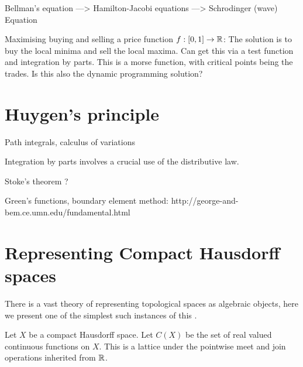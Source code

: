 \documentclass[11pt]{article}
\begin{document}
Bellman's equation ---> Hamilton-Jacobi equations ---> Schrodinger (wave) Equation


Maximising buying and selling a price function $f:[0,1]\to \mathbb R$:
    The solution is to buy the local minima and sell the
    local maxima. Can get this via a test function and
    integration by parts. This is a morse function, with
    critical points being the trades.
    Is this also the dynamic programming solution?

%
%

\section{Huygen's principle}

Path integrals, calculus of variations

Integration by parts involves a crucial use of the distributive law.

Stoke's theorem ? %

Green's functions,
boundary element method: http://george-and-bem.ce.umn.edu/fundamental.html


\section{Representing Compact Hausdorff spaces}


There is a vast theory of representing topological spaces as
algebraic objects, here we present one of the simplest such
instances of this
\cite{Nagata1985}.


Let $X$ be a compact Hausdorff space.
Let $C(X)$ be the set of real valued continuous functions on $X$.
This is a lattice under the pointwise meet and join operations inherited from $\mathbb R$.
\end{document}
